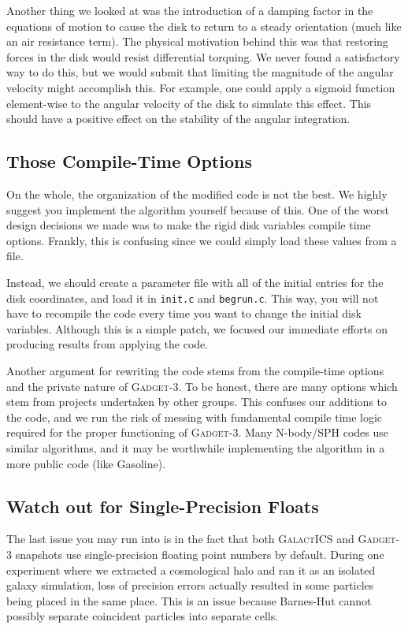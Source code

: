 Another thing we looked at was the introduction of a damping factor in the equations of motion to cause the disk to return to a steady orientation (much like an air resistance term). The physical motivation behind this was that restoring forces in the disk would resist differential torquing. We never found a satisfactory way to do this, but we would submit that limiting the magnitude of the angular velocity might accomplish this. For example, one could apply a sigmoid function element-wise to the angular velocity of the disk to simulate this effect. This should have a positive effect on the stability of the angular integration.


\subsection{Those Compile-Time Options}
On the whole, the organization of the modified code is not the best. We highly suggest you implement the algorithm yourself because of this.   One of the worst design decisions we made was to make the rigid disk variables compile time options. Frankly, this is confusing since we could simply load these values from a file. 

Instead, we should create a parameter file with all of the initial entries for the disk coordinates, and load it in \texttt{init.c} and \texttt{begrun.c}. This way, you will not have to recompile the code every time you want to change the initial disk variables. Although this is a simple patch, we focused our immediate efforts on producing results from applying the code. 

Another argument for rewriting the code stems from the compile-time options and the private nature of \textsc{Gadget-3}. To be honest, there are many options which stem from projects undertaken by other groups. This confuses our additions to the code, and we run the risk of messing with fundamental compile time logic required for the proper functioning of \textsc{Gadget-3}. Many N-body/SPH codes use similar algorithms, and it may be worthwhile implementing the algorithm in a more public code (like Gasoline). 

\subsection{Watch out for Single-Precision Floats}

The last issue you may run into is in the fact that both \textsc{GalactICS} and \textsc{Gadget-3} snapshots use single-precision floating point numbers by default. During one experiment where we extracted a cosmological halo and ran it as an isolated galaxy simulation, loss of precision errors actually resulted in some particles being placed in the same place. This is an issue because Barnes-Hut cannot possibly separate coincident particles into separate cells.


